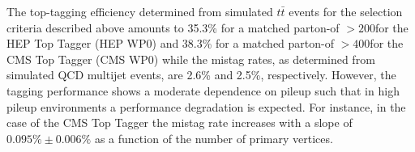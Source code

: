 The top-tagging efficiency determined from simulated $t\bar{t}$ events for the selection criteria described above amounts to 35.3\% for a matched parton-\pt of $> 200$\gev for the HEP Top Tagger (HEP WP0) and 38.3\% for a matched parton-\pt of $> 400$\gev for the CMS Top Tagger (CMS WP0) while the mistag rates, as determined from simulated QCD multijet events, are 2.6\% and 2.5\%, respectively. However, the tagging performance shows a moderate dependence on pileup such that in high pileup environments a performance degradation is expected. For instance, in the case of the CMS Top Tagger %
the mistag rate increases with a slope of $0.095\% \pm 0.006\%$ as a function of the number of primary vertices.       


